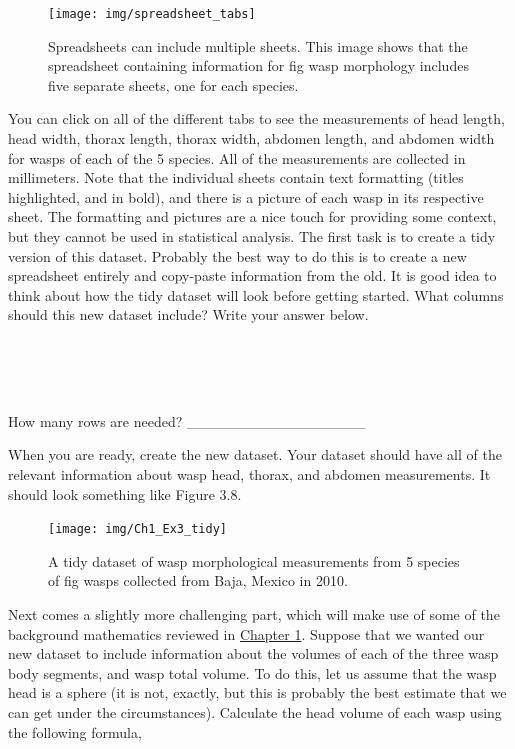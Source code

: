 \documentclass[
]{scrbook}
\begin{document}
\begin{figure}
\texttt{[image: img/spreadsheet\_tabs]} \caption{Spreadsheets can include multiple sheets. This image shows that the spreadsheet containing information for fig wasp morphology includes five separate sheets, one for each species.}\label{fig:unnamed-chunk-17}
\end{figure}

You can click on all of the different tabs to see the measurements of head length, head width, thorax length, thorax width, abdomen length, and abdomen width for wasps of each of the 5 species.
All of the measurements are collected in millimeters.
Note that the individual sheets contain text formatting (titles highlighted, and in bold), and there is a picture of each wasp in its respective sheet.
The formatting and pictures are a nice touch for providing some context, but they cannot be used in statistical analysis.
The first task is to create a tidy version of this dataset.
Probably the best way to do this is to create a new spreadsheet entirely and copy-paste information from the old.
It is good idea to think about how the tidy dataset will look before getting started.
What columns should this new dataset include? Write your answer below.

\begin{verbatim}




\end{verbatim}

How many rows are needed? \_\_\_\_\_\_\_\_\_\_\_\_\_\_\_\_\_

When you are ready, create the new dataset.
Your dataset should have all of the relevant information about wasp head, thorax, and abdomen measurements.
It should look something like Figure 3.8.

\begin{figure}
\texttt{[image: img/Ch1\_Ex3\_tidy]} \caption{A tidy dataset of wasp morphological measurements from 5 species of fig wasps collected from Baja, Mexico in 2010.}\label{fig:unnamed-chunk-18}
\end{figure}

Next comes a slightly more challenging part, which will make use of some of the background mathematics reviewed in \protect\hyperlink{Chapter_1}{Chapter 1}.
Suppose that we wanted our new dataset to include information about the volumes of each of the three wasp body segments, and wasp total volume.
To do this, let us assume that the wasp head is a sphere (it is not, exactly, but this is probably the best estimate that we can get under the circumstances).
Calculate the head volume of each wasp using the following formula,
\end{document}
